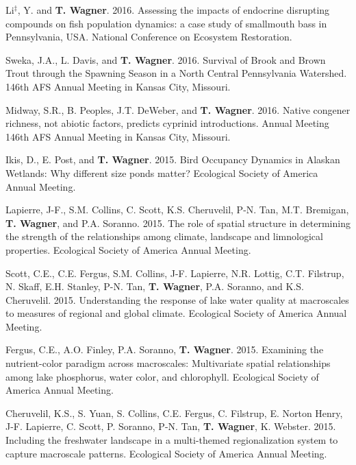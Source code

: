 \documentclass[10pt]{article}
\begin{document}
\begin{flushleft}
\begin{etaremune}
\item Li$^\ddagger$, Y. and  {\bf T. Wagner}. 2016. Assessing the impacts of endocrine disrupting compounds on fish population dynamics: a case study of smallmouth bass in Pennsylvania, USA. National Conference on Ecosystem Restoration. 

\item Sweka, J.A., L. Davis, and {\bf T. Wagner}. 2016. Survival of Brook and Brown Trout through the Spawning Season in a North Central Pennsylvania Watershed. 146th AFS Annual Meeting in Kansas City, Missouri.

\item Midway, S.R., B. Peoples, J.T. DeWeber, and {\bf T. Wagner}. 2016. Native congener richness, not abiotic factors, predicts cyprinid introductions. Annual Meeting 146th AFS Annual Meeting in Kansas City, Missouri. 


\item Ikis, D., E. Post, and {\bf T. Wagner}. 2015. Bird Occupancy Dynamics in Alaskan Wetlands: Why different size ponds matter?  Ecological Society of America Annual Meeting. 

\item Lapierre, J-F., S.M. Collins, C. Scott, K.S. Cheruvelil, P-N. Tan, M.T. Bremigan, {\bf T. Wagner}, and P.A. Soranno. 2015. The role of spatial structure in determining the strength of the relationships among climate, landscape and limnological properties. Ecological Society of America Annual Meeting.\\

\item Scott, C.E., C.E. Fergus, S.M. Collins, J-F. Lapierre, N.R. Lottig, C.T. Filstrup, N. Skaff, E.H. Stanley, P-N. Tan, {\bf T. Wagner}, P.A. Soranno, and K.S. Cheruvelil. 2015. Understanding the response of lake water quality at macroscales to measures of regional and global climate. Ecological Society of America Annual Meeting.

\item Fergus, C.E., A.O. Finley, P.A. Soranno, {\bf T. Wagner}. 2015. Examining the nutrient-color paradigm across macroscales: Multivariate spatial relationships among lake phosphorus, water color, and chlorophyll.  Ecological Society of America Annual Meeting.\\

\item Cheruvelil, K.S., S. Yuan, S. Collins, C.E. Fergus, C. Filstrup, E. Norton Henry, J-F. Lapierre, C. Scott, P. Soranno, P-N. Tan, {\bf T. Wagner}, K. Webster. 2015. Including the freshwater landscape in a multi-themed regionalization system to capture macroscale patterns. Ecological Society of America Annual Meeting.


\end{etaremune}
\end{flushleft}
\end{document}
